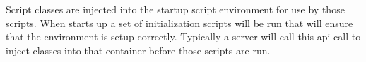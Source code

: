 Script classes are injected into the startup \Reflex script environment for use by those scripts. When \Rapture
starts up a set of initialization \Reflex scripts will be run that will ensure that the environment is setup
correctly. Typically a \Rapture server will call this api call to inject classes into that container before those scripts are run.
